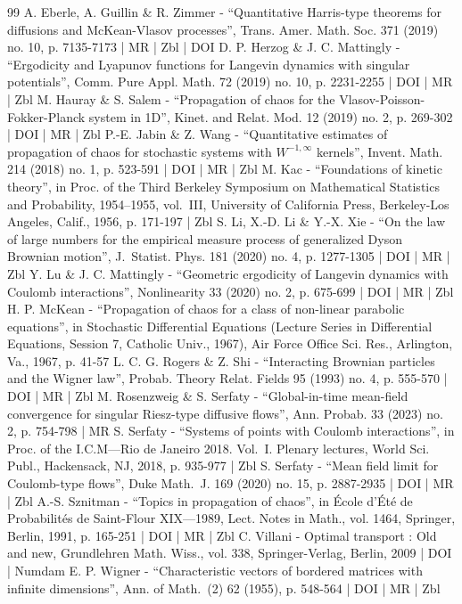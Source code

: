 \begin{thebibliography}{99}
A. Eberle, A. Guillin \& R. Zimmer - “Quantitative Harris-type theorems for diffusions and McKean-Vlasov processes”, Trans. Amer. Math. Soc. 371 (2019) no. 10, p. 7135-7173 | MR | Zbl | DOI
D. P. Herzog \& J. C. Mattingly - “Ergodicity and Lyapunov functions for Langevin dynamics with singular potentials”, Comm. Pure Appl. Math. 72 (2019) no. 10, p. 2231-2255 | DOI | MR | Zbl
M. Hauray \& S. Salem - “Propagation of chaos for the Vlasov-Poisson-Fokker-Planck system in 1D”, Kinet. and Relat. Mod. 12 (2019) no. 2, p. 269-302 | DOI | MR | Zbl
P.-E. Jabin \& Z. Wang - “Quantitative estimates of propagation of chaos for stochastic systems with $W^{-1,\infty }$ kernels”, Invent. Math. 214 (2018) no. 1, p. 523-591 | DOI | MR | Zbl
M. Kac - “Foundations of kinetic theory”, in Proc. of the Third Berkeley Symposium on Mathematical Statistics and Probability, 1954–1955, vol. III, University of California Press, Berkeley-Los Angeles, Calif., 1956, p. 171-197 | Zbl
S. Li, X.-D. Li \& Y.-X. Xie - “On the law of large numbers for the empirical measure process of generalized Dyson Brownian motion”, J. Statist. Phys. 181 (2020) no. 4, p. 1277-1305 | DOI | MR | Zbl
Y. Lu \& J. C. Mattingly - “Geometric ergodicity of Langevin dynamics with Coulomb interactions”, Nonlinearity 33 (2020) no. 2, p. 675-699 | DOI | MR | Zbl
H. P. McKean - “Propagation of chaos for a class of non-linear parabolic equations”, in Stochastic Differential Equations (Lecture Series in Differential Equations, Session 7, Catholic Univ., 1967), Air Force Office Sci. Res., Arlington, Va., 1967, p. 41-57
L. C. G. Rogers \& Z. Shi - “Interacting Brownian particles and the Wigner law”, Probab. Theory Relat. Fields 95 (1993) no. 4, p. 555-570 | DOI | MR | Zbl
M. Rosenzweig \& S. Serfaty - “Global-in-time mean-field convergence for singular Riesz-type diffusive flows”, Ann. Probab. 33 (2023) no. 2, p. 754-798 | MR
S. Serfaty - “Systems of points with Coulomb interactions”, in Proc. of the I.C.M—Rio de Janeiro 2018. Vol. I. Plenary lectures, World Sci. Publ., Hackensack, NJ, 2018, p. 935-977 | Zbl
S. Serfaty - “Mean field limit for Coulomb-type flows”, Duke Math. J. 169 (2020) no. 15, p. 2887-2935 | DOI | MR | Zbl
A.-S. Sznitman - “Topics in propagation of chaos”, in École d’Été de Probabilités de Saint-Flour XIX—1989, Lect. Notes in Math., vol. 1464, Springer, Berlin, 1991, p. 165-251 | DOI | MR | Zbl
C. Villani - Optimal transport : Old and new, Grundlehren Math. Wiss., vol. 338, Springer-Verlag, Berlin, 2009 | DOI | Numdam
E. P. Wigner - “Characteristic vectors of bordered matrices with infinite dimensions”, Ann. of Math. (2) 62 (1955), p. 548-564 | DOI | MR | Zbl
\end{thebibliography}
